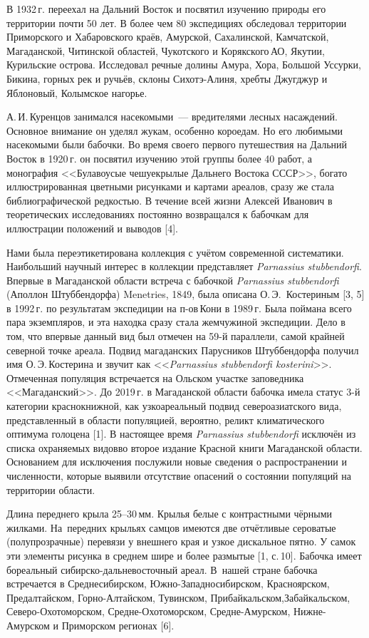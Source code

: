 В 1932\,г. переехал на Дальний Восток и посвятил изучению природы его территории почти 50 лет. В более чем 80 экспедициях обследовал территории Приморского и Хабаровского краёв, Амурской, Сахалинской, Камчатской, Магаданской, Читинской областей, Чукотского и Корякского\,АО, Якутии, Курильские острова. Исследовал речные долины Амура, Хора, Большой Уссурки, Бикина, горных рек и ручьёв, склоны Сихотэ-Алиня, хребты Джугджур и Яблоновый, Колымское нагорье.

А.\,И.\,Куренцов занимался насекомыми~--- вредителями лесных насаждений. Основное внимание он уделял жукам, особенно короедам. Но его любимыми насекомыми были бабочки. Во время своего первого путешествия на Дальний Восток в 1920\,г. он посвятил изучению этой группы более 40 работ, а монография <<Булавоусые чешуекрылые Дальнего Востока СССР>>, богато иллюстрированная цветными рисунками и картами ареалов, сразу же стала библиографической редкостью. В течение всей жизни Алексей Иванович в теоретических исследованиях постоянно возвращался к бабочкам для иллюстрации положений и выводов [4].
\enlargethispage{\baselineskip}

Нами была переэтикетирована коллекция с учётом современной систематики. Наибольший научный интерес в коллекции представляет \textit{Parnassius stubbendorfi}. Впервые в Магаданской области встреча с бабочкой \textit{Parnassius stubbendorfi} (Аполлон Штуббендорфа) Menetries, 1849, была описана О.\,Э.~Костериным [3, 5] в 1992\,г. по результатам экспедиции на п-ов\,Кони в 1989\,г. Была поймана всего пара экземпляров, и эта находка сразу стала жемчужиной экспедиции. Дело в том, что впервые данный вид был отмечен на 59-й параллели, самой крайней северной точке ареала. Подвид магаданских Парусников Штуббендорфа получил имя О.\,Э.\,Костерина и звучит как <<\textit{Parnassius stubbendorfi kosterini}>>. Отмеченная популяция встречается на Ольском участке заповедника <<Магаданский>>. До 2019\,г. в Магаданской области бабочка имела статус 3-й\,категории краснокнижной, как узкоареальный подвид североазиатского вида, представленный в области популяцией, вероятно, реликт климатического оптимума голоцена [1]. В настоящее время \textit{Parnassius stubbendorfi} исключён из списка охраняемых видов во второе издание Красной книги Магаданской области.\\Основанием для исключения послужили новые сведения о распространении и численности, которые выявили отсутствие опасений о состоянии популяций на территории области.

Длина переднего крыла 25--30\,мм. Крылья белые с контрастными чёрными жилками. На~передних крыльях самцов имеются две отчётливые сероватые (полупрозрачные) перевязи у внешнего края и узкое дискальное пятно. У самок эти элементы рисунка в среднем шире и более размытые [1, с.\,10]. Бабочка имеет бореальный сибирско-дальневосточный ареал. В~нашей стране бабочка встречается в Среднесибирском, Южно-Западносибирском, Красноярском, Предалтайском, Горно-Алтайском, Тувинском, Прибайкальском,\;\;Забайкальском, Северо-Охо\-то\-морс\-ком, Средне-Охотоморском, Средне-Амурском, Нижне-Амурском и Приморском регионах [6].

